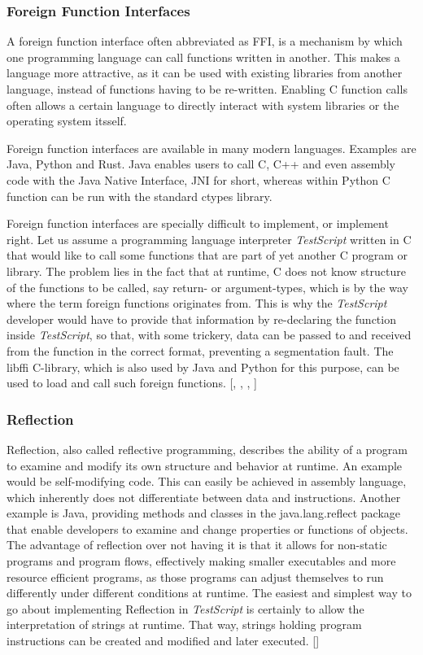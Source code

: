 \documentclass[12pt,a4paper]{article}
\newcommand{\name}{\emph{TestScript}}
\begin{document}
\subsubsection{Foreign Function Interfaces}
A foreign function interface often abbreviated as FFI,
is a mechanism by which one programming language can call functions written 
in another. This makes a language more attractive, as it can be used with
existing libraries from another language, instead of functions having to be
re-written. Enabling C function calls often allows a certain language to
directly interact with system libraries or the operating system itsself.

Foreign function interfaces are available in many modern languages.
Examples are Java, Python and Rust.
Java enables users to call C, C++ and even assembly code with the Java Native
Interface, JNI for short, whereas within Python C function can
be run with the standard ctypes library.

Foreign function interfaces are specially difficult to implement, or implement
right. Let us assume a programming language interpreter \name{} written in C that
would like to call some functions that are part of yet another C program or
library. The problem lies in the fact that at runtime, C does not know
structure of the functions to be called, say return- or argument-types, which
is by the way where the term foreign functions originates from. This is why the
\name{} developer would have to provide that information by re-declaring the
function inside \name{}, so that, with some trickery, data can be passed to and
received from the function in the correct format, preventing a segmentation
fault. The libffi C-library, which is also used by Java and
Python for this purpose, can be used to load and call such foreign functions.
[, , , ]

\subsubsection{Reflection}
Reflection, also called reflective programming, describes
the ability of a program to examine and modify its own structure and behavior 
at runtime. An example would be self-modifying code. This can easily be
achieved in assembly language, which inherently does not differentiate between
data and instructions.
Another example is Java, providing methods and classes in the java.lang.reflect
package that enable developers to examine and change properties or functions
of objects.
The advantage of reflection over not having it is that it allows for non-static
programs and program flows, effectively making smaller executables and more
resource efficient programs, as those programs can adjust themselves to run
differently under different conditions at runtime.
The easiest and simplest way to go about implementing Reflection in \name{} is
certainly to allow the interpretation of strings at runtime. That way, strings
holding program instructions can be created and modified and later executed.
[]
\end{document}
